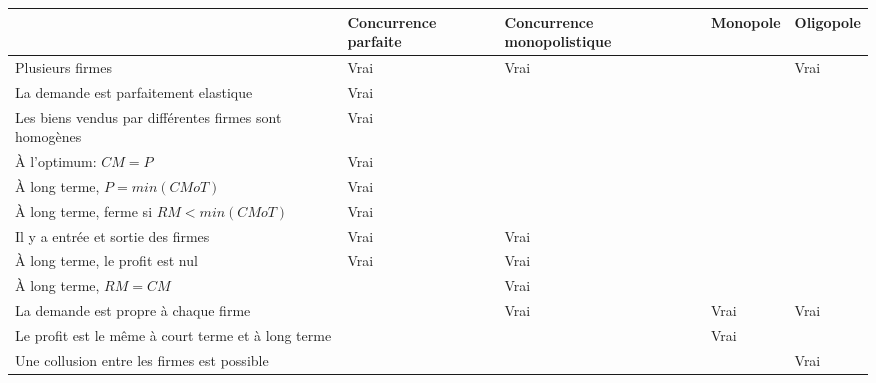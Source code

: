 \begin{center}
\begin{tabular}{|C{4.8cm}|C{2.4cm}|C{2.4cm}|C{2.4cm}|C{2.4cm}|}

\hline
                                                       & Concurrence parfaite      & Concurrence monopolistique & Monopole                  & Oligopole                 \\\hline
Plusieurs firmes                                       &  Vrai &  Vrai  &                           &  Vrai \\\hline
La demande est parfaitement elastique                  &  Vrai &                            &                           &                           \\\hline
Les biens vendus par différentes firmes sont homogènes &  Vrai &                            &                           &                           \\\hline
À l'optimum: $CM=P$                                    &  Vrai &                            &                           &                           \\\hline
À long terme, $P = min(CMoT)$                          &  Vrai &                            &                           &                           \\\hline
À long terme, ferme si $RM < min(CMoT)$                &  Vrai &                            &                           &                           \\\hline
Il y a entrée et sortie des firmes                     &  Vrai &  Vrai  &                           &                           \\\hline
À long terme, le profit  est nul                       &  Vrai &  Vrai  &                           &                           \\\hline
À long terme, $RM=CM$                                  &                           &  Vrai  &                           &                           \\\hline
La demande est propre à chaque firme                   &                           &  Vrai  &  Vrai &  Vrai \\\hline
Le profit est le même à court terme et à long terme    &                           &                            &  Vrai &                           \\\hline
Une collusion entre les firmes est possible            &                           &                            &                           &  Vrai \\\hline

        
\end{tabular}
\end{center}

